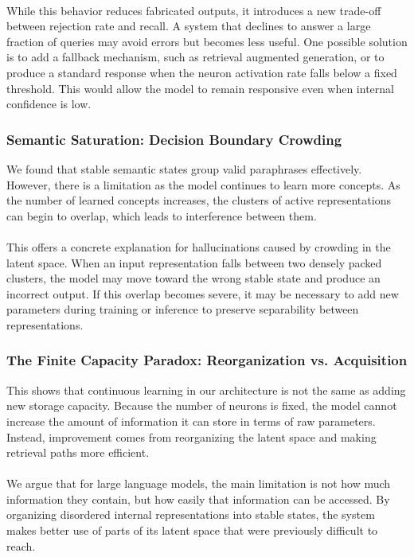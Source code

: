 \documentclass[11pt, letterpaper]{article}
\begin{document}
\paragraph{}
While this behavior reduces fabricated outputs, it introduces a new trade-off between rejection rate and recall. A system that declines to answer a large fraction of queries may avoid errors but becomes less useful. One possible solution is to add a fallback mechanism, such as retrieval augmented generation, or to produce a standard response when the neuron activation rate falls below a fixed threshold. This would allow the model to remain responsive even when internal confidence is low.

\subsubsection{Semantic Saturation: Decision Boundary Crowding}
We found that stable semantic states group valid paraphrases effectively. However, there is a limitation as the model continues to learn more concepts. As the number of learned concepts increases, the clusters of active representations can begin to overlap, which leads to interference between them.

\paragraph{}
This offers a concrete explanation for hallucinations caused by crowding in the latent space. When an input representation falls between two densely packed clusters, the model may move toward the wrong stable state and produce an incorrect output. If this overlap becomes severe, it may be necessary to add new parameters during training or inference to preserve separability between representations.

\subsubsection{The Finite Capacity Paradox: Reorganization vs. Acquisition}
This shows that continuous learning in our architecture is not the same as adding new storage capacity. Because the number of neurons is fixed, the model cannot increase the amount of information it can store in terms of raw parameters. Instead, improvement comes from reorganizing the latent space and making retrieval paths more efficient.

\paragraph{}
We argue that for large language models, the main limitation is not how much information they contain, but how easily that information can be accessed. By organizing disordered internal representations into stable states, the system makes better use of parts of its latent space that were previously difficult to reach.
\end{document}
